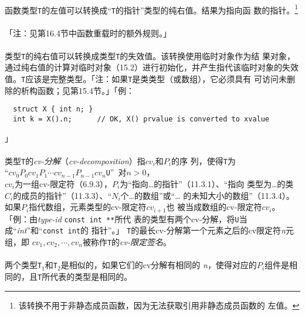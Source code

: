 \paragraph{}
函数类型\texttt{T}的左值可以转换成``\texttt{T}的指针''类型的纯右值。结果为指向函
数的指针。\footnote{该转换不用于非静态成员函数，因为无法获取引用非静态成员函数的
左值。}

\paragraph{}
「注：见第16.4节中函数重载时的额外规则。」

\paragraph{}
类型\texttt{T}的纯右值可以转换成类型\texttt{T}的失效值。该转换使用临时对象作为结
果对象，通过纯右值的计算对临时对象（15.2）进行初始化，并产生指代该临时对象的失效
值。\texttt{T}应该是完整类型。「注：如果\texttt{T}是类类型（或数组），它必须具有
可访问未删除的析构函数；见第15.4节。」「例：
\begin{lstlisting}
  struct X { int n; }
  int k = X().n;      // OK, X() prvalue is converted to xvalue
\end{lstlisting}」

\paragraph{}
类型\texttt{T}的\textit{cv-分解}（\textit{cv-decomposition}）指$cv_i$和$P_i$的序
列，使得\texttt{T}为                                                          \\
\mbox{\qquad\qquad “$cv_0P_0cv_1P_1\cdots cv_{n-1}P_{n-1}cv_n$\texttt{U}”
  对$n > 0$，}                                                                \\
$cv_i$为一组cv-限定符（6.9.3），$P_i$为“指向\ldots 的指针”（11.3.1）、“指向
类型为\ldots 的类$C_i$的成员的指针”（11.3.3）、“$N_i$个\ldots 的数组”或“\ldots
的未知大小的数组”（11.3.4）。如果$P_i$指代数组，元素类型的cv-限定符$cv_{i+1}$也
被当成数组的cv-限定符$cv_i$。「例：由\textit{type-id} \texttt{const int **}所代
表的类型有两个cv-分解，将\texttt{U}当成``\textit{int}''和``\texttt{const int}的
指针''。」 \texttt{T}的最长cv-分解第一个元素之后的cv限定符\textit{n}元组，即
$cv_1, cv_2, \cdots, cv_n$被称作\texttt{T}的\textit{cv-限定签名}。

\paragraph{}
两个类型\texttt{T$_1$}和\texttt{T$_2$}是相似的，如果它们的cv分解有相同的
\textit{n}，使得对应的$P_i$组件是相同的，且\texttt{T}所代表的类型是相同的。

